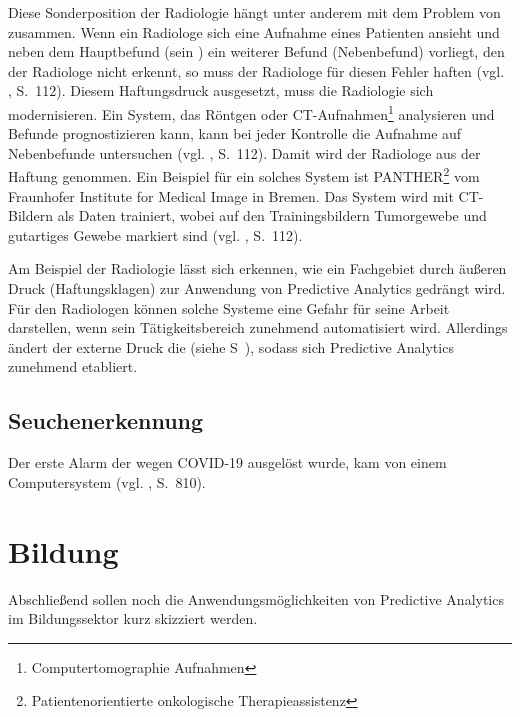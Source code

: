 Diese Sonderposition der Radiologie hängt unter anderem mit dem Problem von \grqq{} zusammen.
Wenn ein Radiologe sich eine Aufnahme eines Patienten ansieht und neben dem Hauptbefund (sein \grqq{})
ein weiterer Befund (Nebenbefund) vorliegt, den der Radiologe nicht erkennt, so muss der Radiologe für diesen Fehler haften
(vgl. \cite{Jorzig}, S.~112). Diesem Haftungsdruck ausgesetzt, muss die Radiologie sich modernisieren. Ein System,
das Röntgen oder CT-Aufnahmen\footnote{Computertomographie Aufnahmen} analysieren und Befunde prognostizieren kann, kann
bei jeder Kontrolle die Aufnahme auf Nebenbefunde untersuchen (vgl. \cite{Jorzig}, S.~112).
Damit wird der Radiologe aus der Haftung genommen. Ein Beispiel für ein solches System ist
PANTHER\footnote{Patientenorientierte onkologische Therapieassistenz} vom Fraunhofer Institute for Medical Image in Bremen.
Das System wird mit CT-Bildern als Daten trainiert, wobei auf den Trainingsbildern Tumorgewebe und gutartiges Gewebe markiert sind
(vgl. \cite{Jorzig}, S.~112).

Am Beispiel der Radiologie lässt sich erkennen, wie ein Fachgebiet durch äußeren Druck (Haftungsklagen) zur Anwendung von Predictive
Analytics gedrängt wird. Für den Radiologen können solche Systeme eine Gefahr für seine Arbeit darstellen, wenn sein Tätigkeitsbereich
zunehmend automatisiert wird. Allerdings ändert der externe Druck die \grqq{} (siehe S~\xcom), sodass
sich Predictive Analytics zunehmend etabliert.

\subsection{Seuchenerkennung}

Der erste Alarm der wegen COVID-19 ausgelöst wurde, kam von einem Computersystem (vgl. \cite{Cho}, S.~810).




\section{Bildung}
Abschließend sollen noch die Anwendungsmöglichkeiten von Predictive Analytics
im Bildungssektor kurz skizziert werden.

